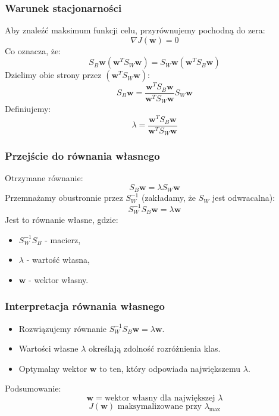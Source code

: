 \documentclass{beamer}
\begin{document}
\begin{frame}
    \frametitle{Warunek stacjonarności}
    Aby znaleźć maksimum funkcji celu, przyrównujemy pochodną do zera:
    \[
    \nabla J(\mathbf{w}) = 0
    \]
    Co oznacza, że:
    \[
    S_B \mathbf{w} (\mathbf{w}^T S_W \mathbf{w}) = S_W \mathbf{w} (\mathbf{w}^T S_B \mathbf{w})
    \]
    Dzielimy obie strony przez \((\mathbf{w}^T S_W \mathbf{w})\):
    \[
    S_B \mathbf{w} = \frac{\mathbf{w}^T S_B \mathbf{w}}{\mathbf{w}^T S_W \mathbf{w}} S_W \mathbf{w}
    \]
    Definiujemy:
    \[
    \lambda = \frac{\mathbf{w}^T S_B \mathbf{w}}{\mathbf{w}^T S_W \mathbf{w}}
    \]
\end{frame}






\begin{frame}
    \frametitle{Przejście do równania własnego}
    Otrzymane równanie:
    \[
    S_B \mathbf{w} = \lambda S_W \mathbf{w}
    \]
    Przemnażamy obustronnie przez \( S_W^{-1} \) (zakładamy, że \( S_W \) jest odwracalna):
    \[
    S_W^{-1} S_B \mathbf{w} = \lambda \mathbf{w}
    \]
    Jest to równanie własne, gdzie:
    \begin{itemize}
        \item \( S_W^{-1} S_B \) - macierz,
        \item \(\lambda\) - wartość własna,
        \item \(\mathbf{w}\) - wektor własny.
    \end{itemize}
\end{frame}







\begin{frame}
    \frametitle{Interpretacja równania własnego}
    \begin{itemize}
        \item Rozwiązujemy równanie \( S_W^{-1} S_B \mathbf{w} = \lambda \mathbf{w} \).
        \item Wartości własne \(\lambda\) określają zdolność rozróżnienia klas.
        \item Optymalny wektor \(\mathbf{w}\) to ten, który odpowiada największemu \(\lambda\).
    \end{itemize}
    Podsumowanie:
    \[
    \mathbf{w} = \text{wektor własny dla największej } \lambda
    \]
    \[
    J(\mathbf{w}) \text{ maksymalizowane przy } \lambda_{\text{max}}
    \]
\end{frame}
\end{document}
